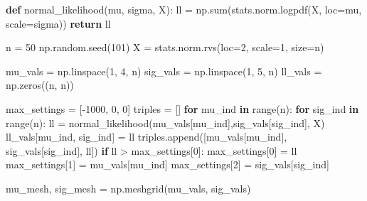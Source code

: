 \documentclass[]{tufte-book}
\newenvironment{Shaded}{}{}
\newcommand{\BuiltInTok}[1]{#1}
\newcommand{\ControlFlowTok}[1]{\textcolor[rgb]{0.00,0.44,0.13}{\textbf{#1}}}
\newcommand{\DecValTok}[1]{\textcolor[rgb]{0.25,0.63,0.44}{#1}}
\newcommand{\KeywordTok}[1]{\textcolor[rgb]{0.00,0.44,0.13}{\textbf{#1}}}
\newcommand{\NormalTok}[1]{#1}
\newcommand{\OperatorTok}[1]{\textcolor[rgb]{0.40,0.40,0.40}{#1}}
\theoremstyle{definition}
\theoremstyle{definition}
\theoremstyle{definition}
\theoremstyle{remark}
\begin{document}
\begin{Shaded}
\begin{Highlighting}[]

\KeywordTok{def}\NormalTok{ normal\_likelihood(mu, sigma, X):}
\NormalTok{  ll }\OperatorTok{=}\NormalTok{ np.}\BuiltInTok{sum}\NormalTok{(stats.norm.logpdf(X, loc}\OperatorTok{=}\NormalTok{mu, scale}\OperatorTok{=}\NormalTok{sigma))}
  \ControlFlowTok{return}\NormalTok{ ll}

\NormalTok{n }\OperatorTok{=} \DecValTok{50}
\NormalTok{np.random.seed(}\DecValTok{101}\NormalTok{)}
\NormalTok{X }\OperatorTok{=}\NormalTok{ stats.norm.rvs(loc}\OperatorTok{=}\DecValTok{2}\NormalTok{, scale}\OperatorTok{=}\DecValTok{1}\NormalTok{, size}\OperatorTok{=}\NormalTok{n)}

\NormalTok{mu\_vals }\OperatorTok{=}\NormalTok{ np.linspace(}\DecValTok{1}\NormalTok{, }\DecValTok{4}\NormalTok{, n)}
\NormalTok{sig\_vals }\OperatorTok{=}\NormalTok{ np.linspace(}\DecValTok{1}\NormalTok{, }\DecValTok{5}\NormalTok{, n)}
\NormalTok{ll\_vals }\OperatorTok{=}\NormalTok{ np.zeros((n, n))}

\NormalTok{max\_settings }\OperatorTok{=}\NormalTok{ [}\OperatorTok{{-}}\DecValTok{1000}\NormalTok{, }\DecValTok{0}\NormalTok{, }\DecValTok{0}\NormalTok{]}
\NormalTok{triples }\OperatorTok{=}\NormalTok{ []}
\ControlFlowTok{for}\NormalTok{ mu\_ind }\KeywordTok{in} \BuiltInTok{range}\NormalTok{(n):}
  \ControlFlowTok{for}\NormalTok{ sig\_ind }\KeywordTok{in} \BuiltInTok{range}\NormalTok{(n):}
\NormalTok{    ll }\OperatorTok{=}\NormalTok{ normal\_likelihood(mu\_vals[mu\_ind],sig\_vals[sig\_ind], X)}
\NormalTok{    ll\_vals[mu\_ind, sig\_ind] }\OperatorTok{=}\NormalTok{ ll}
\NormalTok{    triples.append([mu\_vals[mu\_ind], sig\_vals[sig\_ind], ll])}
    \ControlFlowTok{if}\NormalTok{ ll }\OperatorTok{\textgreater{}}\NormalTok{ max\_settings[}\DecValTok{0}\NormalTok{]:}
\NormalTok{        max\_settings[}\DecValTok{0}\NormalTok{] }\OperatorTok{=}\NormalTok{ ll}
\NormalTok{        max\_settings[}\DecValTok{1}\NormalTok{] }\OperatorTok{=}\NormalTok{ mu\_vals[mu\_ind]}
\NormalTok{        max\_settings[}\DecValTok{2}\NormalTok{] }\OperatorTok{=}\NormalTok{ sig\_vals[sig\_ind]}
                                                   
\NormalTok{mu\_mesh, sig\_mesh }\OperatorTok{=}\NormalTok{ np.meshgrid(mu\_vals, sig\_vals)}


\end{Highlighting}
\end{Shaded}
\end{document}
